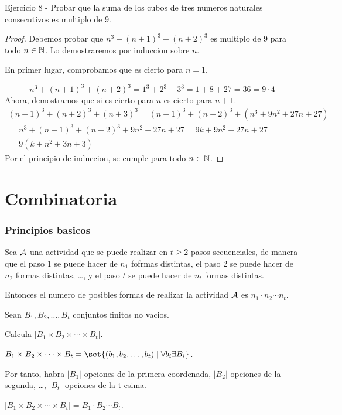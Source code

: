\begin{example}
	Ejercicio 8 - Probar que la suma de los cubos de tres numeros naturales consecutivos es multiplo de 9.
\end{example}
\begin{proof}
	Debemos probar que \(n^{3} + (n+1)^{3} + (n+2)^{3}\) es multiplo de 9 para todo \(n \in \mathbb{N} \). Lo demostraremos por induccion sobre \(n \).
	
	En primer lugar, comprobamos que es cierto para \(n = 1\).
	
	\[
		n^{3} + (n+1 )^{3} + (n+2)^{3} = 1^{3} + 2^{3} + 3^{3} = 1 + 8 + 27 = 36 = 9 \cdot 4
	\]
	Ahora, demostramos que si es cierto para \(n \) es cierto para \(n + 1 \).
	\begin{multline*}
		(n+1)^{3} + (n+2)^{3} + (n+3)^{3} = (n+1)^{3} + (n+2)^{3} + (n^{3} + 9n^{2} + 27n + 27) = \\  = n^{3} + (n+1)^{3} + (n+2)^{3} + 9n^{2} + 27n + 27 = 9k + 9n^{2} + 27n + 27 = \\ = \boxed{9(k + n^{2} + 3n + 3)}
	\end{multline*}
	Por el principio de induccion, se cumple para todo \(n \in \mathbb{N} \).
\end{proof}

\part{Combinatoria}
\section{Principios basicos}
\begin{proposition}
	Sea \(\mathcal{\MakeUppercase{a}}\) una actividad que se puede realizar en \(t \geq  2 \) pasos secuenciales, de manera que el paso 1 se puede hacer de \(n_1 \) fofrmas distintas, el paso 2 se puede hacer de \(n_2 \) formas distintas, \dots, y el paso \(t \) se puede hacer de \(n_t \) formas distintas.
	
	Entonces el numero de posibles formas de realizar la actividad \(\mathcal{\MakeUppercase{a}} \) es \(n_1 \cdot n_2 \cdots n_t\).
\end{proposition}

\begin{example}
	Sean \(B_1, B_2, \ldots, B_t \) conjuntos finitos no vacios.
	
	Calcula \(|B_1 \times B_2 \times \cdots \times B_t|\).
	
	\(B_1 \times B_2 \times \cdots \times B_t = \set{(b_1, b_2, \ldots, b_t) \mid \forall b_i \exists B_i}\).
	
	Por tanto, habra \(|B_1| \) opciones de la primera coordenada, \(|B_2| \) opciones de la segunda, \dots, \(|B_t| \) opciones de la t-esima.
	
	\(|B_1 \times B_2 \times \cdots \times B_t| = B_1 \cdot B_2 \cdots B_t\).
\end{example}

